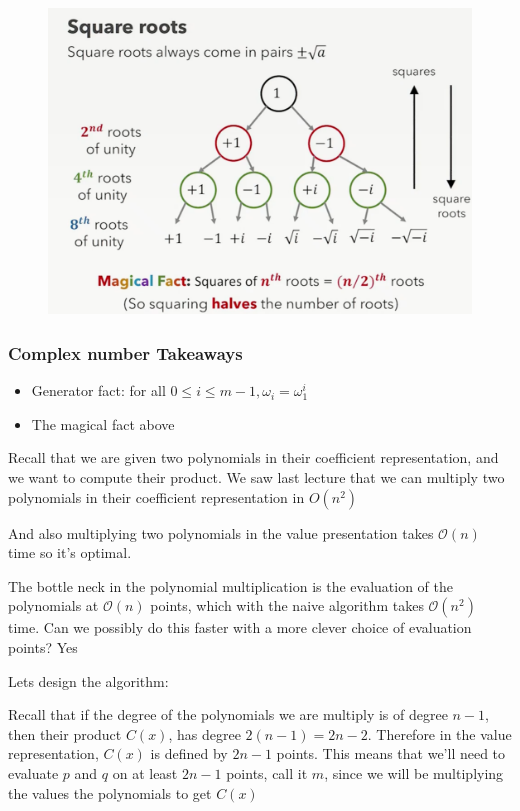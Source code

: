 \documentclass[12pt]{article}
\renewcommand{\O}{\mathcal{O}}
\begin{document}
\begin{figure}[H]
    \centering
    \includegraphics[scale=0.3]{images/unity.png}
    \caption{}
\end{figure}

\subsubsection*{Complex number Takeaways}
\begin{itemize}
    \item Generator fact: for all $0 \le i \le m - 1, \omega_i = \omega_1^i$
    \item The magical fact above
\end{itemize}



Recall that we are given two polynomials in their coefficient representation, and we want to compute their product. We saw last lecture that we can multiply two polynomials in their coefficient representation in $O(n^2)$

And also multiplying two polynomials in the value presentation takes $\O(n)$ time so it's optimal.


The bottle neck in the polynomial multiplication is the evaluation of the polynomials at $\O(n)$ points, which with the naive algorithm takes $\O(n^2)$ time. Can we possibly do this faster with a more clever choice of evaluation points? Yes

Lets design the algorithm:

Recall that if the degree of the polynomials we are multiply is of degree $n - 1$, then their product $C(x)$, has degree $2(n - 1) = 2n - 2$. Therefore in the value representation, $C(x)$ is defined by $2n - 1$ points. This means that we'll need to evaluate $p$ and $q$ on at least $2n - 1$ points, call it $m$, since we will be multiplying the values the polynomials to get $C(x)$
\end{document}
